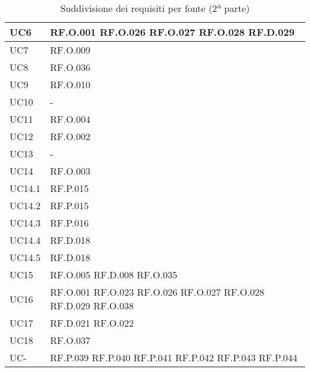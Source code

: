 \begin{table}[H]
\centering
    \begin{tabular}{|C{3.0cm}|C{3.0cm}|}
        \hline
        UC6 &
        RF.O.001 \newline
        RF.O.026 \newline
        RF.O.027 \newline
        RF.O.028 \newline
        RF.D.029 \\
        \hline
        UC7 &
        RF.O.009 \\
        \hline
        UC8 &
        RF.O.036 \\
        \hline
        UC9 &
        RF.O.010 \\
        \hline
        UC10 &
        - \\
        \hline
        UC11 &
        RF.O.004 \\
        \hline
        UC12 &
        RF.O.002 \\
        \hline
        UC13 &
        - \\
        \hline
        UC14 &
        RF.O.003 \\
        \hline
        UC14.1 &
        RF.P.015 \\
        \hline
        UC14.2 &
        RF.P.015 \\
        \hline
        UC14.3 &
        RF.P.016 \\
        \hline
        UC14.4 &
        RF.D.018 \\
        \hline
        UC14.5 &
        RF.D.018 \\
        \hline
        UC15 &
        RF.O.005 \newline
        RF.D.008 \newline
        RF.O.035 \\
        \hline
        UC16 &
        RF.O.001 \newline
        RF.O.023 \newline
        RF.O.026 \newline
        RF.O.027 \newline
        RF.O.028 \newline
        RF.D.029 \newline
        RF.O.038 \\
        \hline
        UC17 &
        RF.D.021 \newline
        RF.O.022 \\
        \hline
        UC18 &
        RF.O.037 \\
        \hline
        UC- &
        RF.P.039 \newline
        RF.P.040 \newline
        RF.P.041 \newline
        RF.P.042 \newline
        RF.P.043 \newline
        RF.P.044 \\
        \hline
    \end{tabular}
    \caption{Suddivisione dei requisiti per fonte (2\textsuperscript{a} parte)}
\end{table}

